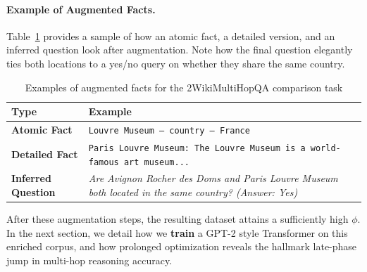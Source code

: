             \paragraph{Example of Augmented Facts.}
                Table~\ref{tab:augmented_examples} provides a sample of how an atomic fact, a detailed version, and an inferred question look after augmentation. Note how the final question elegantly ties both locations to a yes/no query on whether they share the same country.
                
                \begin{table}[h]
                \small
                    \centering
                    \caption{Examples of augmented facts for the 2WikiMultiHopQA comparison task}
                    \vskip 0.1in
                    \label{tab:augmented_examples}
                    \begin{tabular}{p{1.6cm} p{6cm}}
                        \toprule
                        \textbf{Type} & \textbf{Example} \\
                        \midrule
                        \textbf{Atomic Fact} & \texttt{Louvre Museum -- country -- France}\\
                        \textbf{Detailed Fact} & \texttt{Paris Louvre Museum: The Louvre Museum is a world-famous art museum...}\\
                        \textbf{Inferred Question} & \emph{Are Avignon Rocher des Doms and Paris Louvre Museum both located in the same country? (Answer: Yes)} \\
                        \bottomrule
                    \end{tabular}
                \end{table}
                
                \noindent After these augmentation steps, the resulting dataset attains a sufficiently high \(\phi\). In the next section, we detail how we \textbf{train} a GPT-2 style Transformer on this enriched corpus, and how prolonged optimization reveals the hallmark late-phase jump in multi-hop reasoning accuracy.
            